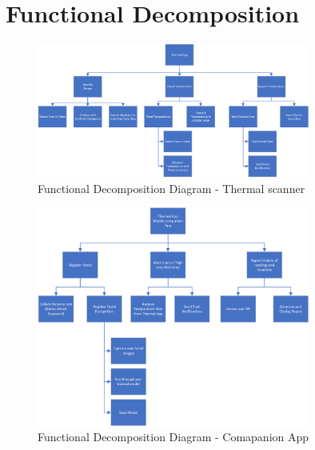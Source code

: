 \documentclass[12pt, letterpaper]{article}
\begin{document}
    \section{Functional Decomposition}
    \begin{figure}[h!]
        \centering
        \includegraphics[width=0.8\textwidth]{Function diagram-Thermal App.png}
        \caption{Functional Decomposition Diagram - Thermal scanner}
    \end{figure}
    \begin{figure}[h!]
        \centering
        \includegraphics[width=0.8\textwidth]{Function diagram-Mobile Comapanion App.png}
        \caption{Functional Decomposition Diagram - Comapanion App}
    \end{figure}
    \newpage
\end{document}
